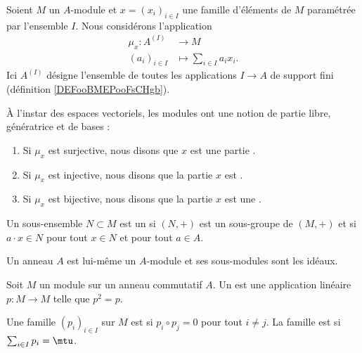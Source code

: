Soient \( M\) un \( A\)-module et \( x=(x_i)_{i\in I}\) une famille d'éléments de \( M\) paramétrée par l'ensemble \( I\). Nous considérons l'application
\begin{equation}
    \begin{aligned}
        \mu_x\colon A^{(I)}&\to M \\
        (a_i)_{i\in I}&\mapsto \sum_{i\in I}a_ix_i.
    \end{aligned}
\end{equation}
Ici \( A^{(I)}\) désigne l'ensemble de toutes les applications \( I\to A\) de support fini (définition \ref{DEFooBMEPooFsCHgb}).

\begin{definition}      \label{DefBasePouyKj}
    À l'instar des espaces vectoriels, les modules ont une notion de partie libre, génératrice et de bases :
    \begin{enumerate}
        \item
            Si \( \mu_x\) est surjective, nous disons que \( x\) est une partie .
        \item
            Si \( \mu_x\) est injective, nous disons que la partie \( x\) est .
        \item
            Si \( \mu_x\) est bijective, nous disons que la partie \( x\) est une .
    \end{enumerate}
\end{definition}

\begin{definition}
  Un sous-ensemble \( N\subset M\) est un  si \( (N,+)\) est un sous-groupe de \( (M,+)\) et si \( a\cdot x\in N\) pour tout \( x\in N\) et pour tout \( a\in A\).
\end{definition}

\begin{example}
    Un anneau \( A\) est lui-même un \( A\)-module et ses sous-modules sont les idéaux.
\end{example}

\begin{definition}
    Soit \( M\) un module sur un anneau commutatif \( A\). Un  est une application linéaire \( p\colon M\to M\) telle que \( p^2=p\).

    Une famille \( (p_i)_{i\in I}\) sur \( M\) est  si \( p_i\circ p_j=0\) pour tout \( i\neq j\). La famille est  si \( \sum_{i\in I}p_i=\mtu\).
\end{definition}

